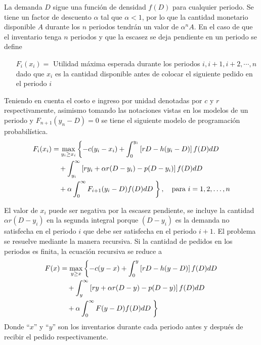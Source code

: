 La demanda $D$ sigue una función de densidad $f(D)$ para cualquier periodo. Se tiene un factor de descuento $\alpha$ tal que $\alpha < 1$, por lo que la cantidad monetario disponible $A$ durante los $n$ periodos tendrán un valor de ${\alpha}^{n}A$. En el caso de que el inventario tenga $n$ periodos y que la escasez se deja pendiente en un periodo se define
\begin{itemize}
	\item[${F}_{i}({x}_{i}) =$] Utilidad máxima esperada durante los periodos $i, i+1, i+2, \cdots, n$ dado que ${x}_{i}$ es la cantidad disponible antes de colocar el siguiente pedido en el periodo $i$  
\end{itemize}
Teniendo en cuenta el costo e ingreso por unidad denotadas por $c$ y $r$ respectivamente, asimismo tomando las notaciones vistas en los modelos de un periodo y ${F}_{n+1}({y}_{n}-D)=0$ se tiene el siguiente modelo de programación probabilística.
\begin{align}
    F_{i}(x_{i}) &= \max_{y_{i} \geq x_{i}} 
    \left\{ -c({y}_{i}-{x}_{i}) + \int_{0}^{{y}_{i}} \left[ rD - h ({y}_{i}-D) \right] f(D) dD \right. \nonumber \\
    & \quad + \int_{{y}_{i}}^{\infty} \left[ r{y}_{i}+ \alpha r (D-{y}_{i}) - p(D-{y}_{i}) \right] f(D) dD \nonumber \\
    & \quad + \alpha \int_{0}^{\infty} F_{i+1}({y}_{i}-D) f(D) dD 
    \left. \vphantom{\int_{0}^{\infty}} \right\}, \quad \text{para } i = 1,2, \dots, n
\end{align}

El valor de ${x}_{i}$ puede ser negativa por la escasez pendiente, se incluye la cantidad $\alpha r (D-{y}_{i})$ en la segunda integral porque $(D - {y}_{i})$ es la demanda no satisfecha en el periodo $i$ que debe ser satisfecha en el periodo $i+1$. El problema se resuelve mediante la manera recursiva. Si la cantidad de pedidos en los periodos es finita, la ecuación recursiva se reduce a
\begin{align}
    F(x) &= \max_{y \geq x} 
    \left\{ -c(y-x) + \int_{0}^{y} \left[ rD - h (y-D) \right] f(D) dD \right. \nonumber \\
    & \quad + \int_{y}^{\infty} \left[ ry+ \alpha r (D-y) - p(D-y) \right] f(D) dD \nonumber \\
    & \quad + \alpha \int_{0}^{\infty} F(y-D) f(D) dD 
    \left. \vphantom{\int_{0}^{\infty}} \right\}
\end{align}
Donde ``$x$'' y ``$y$'' son los inventarios durante cada periodo antes y después de recibir el pedido respectivamente.

